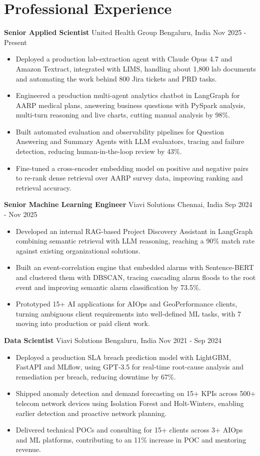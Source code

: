 \documentclass[10pt,a4paper]{article}
\newcommand{\role}[4]{\textbf{#1} \textbar{} #2 \hfill #3 \textbar{} #4\par}
\begin{document}
\section{Professional Experience}
\role{Senior Applied Scientist}{United Health Group}{Bengaluru, India}{Nov 2025 - Present}
\begin{itemize}
  \item Deployed a production lab-extraction agent with Claude Opus 4.7 and Amazon Textract, integrated with LIMS, handling about 1,800 lab documents and automating the work behind 800 Jira tickets and PRD tasks.
  \item Engineered a production multi-agent analytics chatbot in LangGraph for AARP medical plans, answering business questions with PySpark analysis, multi-turn reasoning and live charts, cutting manual analysis by 98\%.
  \item Built automated evaluation and observability pipelines for Question Answering and Summary Agents with LLM evaluators, tracing and failure detection, reducing human-in-the-loop review by 43\%.
  \item Fine-tuned a cross-encoder embedding model on positive and negative pairs to re-rank dense retrieval over AARP survey data, improving ranking and retrieval accuracy.
\end{itemize}
\vspace{3pt}
\role{Senior Machine Learning Engineer}{Viavi Solutions}{Chennai, India}{Sep 2024 - Nov 2025}
\begin{itemize}
  \item Developed an internal RAG-based Project Discovery Assistant in LangGraph combining semantic retrieval with LLM reasoning, reaching a 90\% match rate against existing organizational solutions.
  \item Built an event-correlation engine that embedded alarms with Sentence-BERT and clustered them with DBSCAN, tracing cascading alarm floods to the root event and improving semantic alarm classification by 73.5\%.
  \item Prototyped 15+ AI applications for AIOps and GeoPerformance clients, turning ambiguous client requirements into well-defined ML tasks, with 7 moving into production or paid client work.
\end{itemize}
\vspace{3pt}
\role{Data Scientist}{Viavi Solutions}{Bengaluru, India}{Nov 2021 - Sep 2024}
\begin{itemize}
  \item Deployed a production SLA breach prediction model with LightGBM, FastAPI and MLflow, using GPT-3.5 for real-time root-cause analysis and remediation per breach, reducing downtime by 67\%.
  \item Shipped anomaly detection and demand forecasting on 15+ KPIs across 500+ telecom network devices using Isolation Forest and Holt-Winters, enabling earlier detection and proactive network planning.
  \item Delivered technical POCs and consulting for 15+ clients across 3+ AIOps and ML platforms, contributing to an 11\% increase in POC and mentoring revenue.
\end{itemize}
\end{document}

